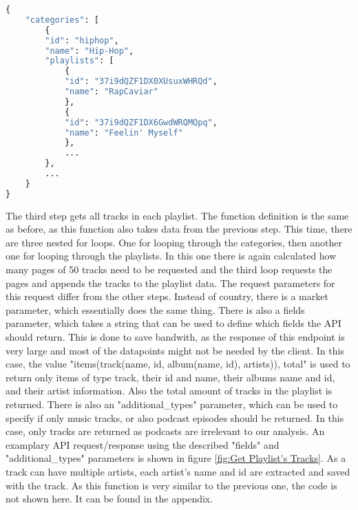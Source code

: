 \begin{lstlisting}[language=Python]
{
    "categories": [
        {
        "id": "hiphop",
        "name": "Hip-Hop",
        "playlists": [
            {
            "id": "37i9dQZF1DX0XUsuxWHRQd",
            "name": "RapCaviar"
            },
            {
            "id": "37i9dQZF1DX6GwdWRQMQpq",
            "name": "Feelin' Myself"
            },
            ...
        },
        ...
    }
}
\end{lstlisting}

The third step gets all tracks in each playlist. The function definition is the same as before, as this function also
takes data from the previous step. This time, there are three nested for loops. One for looping through the categories,
then another one for looping through the playlists. In this one there is again calculated how many pages of 50 tracks
need to be requested and the third loop requests the pages and appends the tracks to the playlist data.
The request parameters for this request differ from the other steps. Instead of country, there is a market parameter,
which essentially does the same thing. There is also a fields parameter, which takes a string that can be used to
define which fields the API should return. This is done to save bandwith, as the response of this endpoint is very large and most
of the datapoints might not be needed by the client.
In this case, the value "items(track(name, id, album(name, id), artists)), total" is used to return only items of type track,
their id and name, their albums name and id, and their artist information. Also the total amount of tracks in the playlist is returned.
There is also an "additional\_types" parameter, which can be used to specify if only music tracks, or also podcast episodes should be returned.
In this case, only tracks are returned as podcasts are irrelevant to our analysis.
An examplary API request/response using the described "fields" and "additional\_types" parameters is shown in figure \ref{fig:Get Playlist's Tracks}.
As a track can have multiple artists, each artist's name and id are extracted and saved with the track.
As this function is very similar to the previous one, the code is not shown here. It can be found in the appendix.

